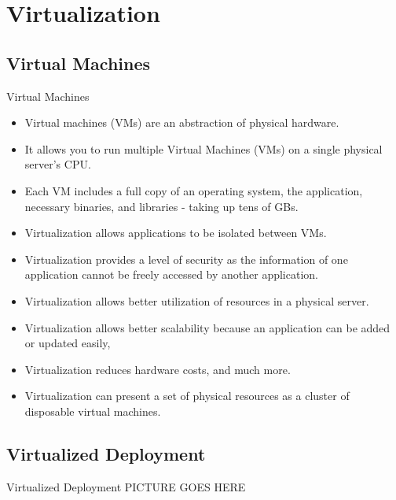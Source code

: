 

\section{Virtualization}\label{sec:virtualization}

\subsection{Virtual Machines}\label{subsec:virtual-machines}
\begin{frame}{Virtual Machines}
    \begin{itemize}
        \item Virtual machines (VMs) are an abstraction of physical hardware.
        \item It allows you to run multiple Virtual Machines (VMs) on a single physical server's CPU\@.
        \item Each VM includes a full copy of an operating system, the application, necessary binaries, and libraries - taking up tens of GBs.
        \item Virtualization allows applications to be isolated between VMs.
        \item Virtualization provides a level of security as the information of one application cannot be freely accessed by another application.
        \item Virtualization allows better utilization of resources in a physical server.
        \item Virtualization allows better scalability because an application can be added or updated easily,
        \item Virtualization reduces hardware costs, and much more.
        \item Virtualization can present a set of physical resources as a cluster of disposable virtual machines.
    \end{itemize}
\end{frame}

\subsection{Virtualized Deployment}\label{subsec:virtualized-deployment}
\begin{frame}{Virtualized Deployment}
    PICTURE GOES HERE
\end{frame}

